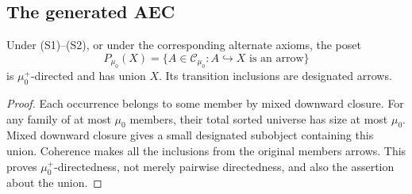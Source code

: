 \subsection{The generated AEC}\label{app:completion}
\begin{lemma}\label{prop:eligible-mu0-union}
Under (S1)--(S2), or under the corresponding alternate axioms, the poset
\[
 P_{\mu_0}(X)=\{A\in\mathcal C_{\mu_0}:A\hookrightarrow X\text{ is an arrow}\}
\]
is $\mu_0^+$-directed and has union $X$. Its transition inclusions are
designated arrows.
\end{lemma}
\begin{proof}
Each occurrence belongs to some member by mixed downward closure.
For any family of at most $\mu_0$ members, their total sorted universe
has size at most $\mu_0$. Mixed downward closure gives a small designated
subobject containing this union. Coherence makes all the inclusions
from the original members arrows. This proves $\mu_0^+$-directedness,
not merely pairwise directedness, and also the assertion about the union.
\end{proof}

